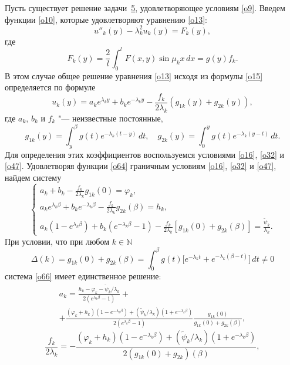 \smallskip

Пусть существует решение задачи~\hyperlink{sab:task5}{5}, удовлетворяющее условиям \eqref{o9}. 
Введем функции \eqref{o10}, которые удовлетворяют уравнению \eqref{o13}:
$$
u''_k(y)-\lambda^2_ku_k(y)=F_k(y), 
$$
где
$$
F_k(y)=\frac{2}{l}\int _{0}^{l}F(x,y)\sin\mu_kx\,dx=g(y)f_k.
$$
В этом случае общее решение уравнения \eqref{o13} исходя из формулы \eqref{o15} определяется по формуле
\begin{equation}
\label{o64}
u_k(y)=a_ke^{\lambda_ky}+b_ke^{-\lambda_ky}-\frac{f_k}{2\lambda_k} \left(g_{1k}(y)+g_{2k}(y)\right),
\end{equation}
где $a_k$, $b_k$ и $f_k$ "--- неизвестные постоянные,
\begin{equation}
\label{o65}
g_{1k}(y)=\int _{y}^{\beta}g(t)e^{-\lambda_k(t-y)}\,dt,\quad  
g_{2k}(y)=\int _{0}^{y}g(t)e^{-\lambda_k(y-t)}\,dt.
\end{equation}
Для определения этих коэффициентов воспользуемся условиями \eqref{o16}, \eqref{o32} и \eqref{o47}.
Удовлетворяя функции \eqref{o64} граничным условиям \eqref{o16}, \eqref{o32} и \eqref{o47}, найдем систему
\begin{equation}
\label{o66}
\begin{cases}
      \displaystyle a_k+b_k-\frac{f_k}{2\lambda_k}g_{1k}(0)=\varphi_k, \\
      \displaystyle a_ke^{\lambda_k\beta}+b_ke^{-\lambda_k\beta}-\frac{f_k}{2\lambda_k}g_{2k}(\beta)=h_k,\\
      \displaystyle a_k(1-e^{\lambda_k\beta})+b_k(e^{-\lambda_k\beta}-1)-\frac{f_k}{2\lambda_k} [g_{1k}(0)+g_{2k}(\beta)]=\frac{\widetilde{\psi}_k}{\lambda_k}.
    \end{cases}
\end{equation}
При условии, что при любом $k\in\mathbb{N}$
\begin{equation}\label{o67}
\Delta(k)=g_{1k}(0)+g_{2k}(\beta)=\int _{0}^{\beta}g(t) \bigl[e^{-\lambda_kt}+e^{-\lambda_k(\beta-t)}\bigr]\,dt\neq0
\end{equation}
система \eqref{o66} имеет единственное решение:
\begin{multline}
\label{o68} 
a_k=\frac{h_k-\varphi_k-\widetilde{\psi}_k/\lambda_k}{2(e^{\lambda_k\beta}-1)}+ 
\\+
\frac{(\varphi_k+h_k)(1-e^{-\lambda_k\beta})+(\widetilde{\psi}_k/\lambda_k)(1+e^{-\lambda_k\beta})} {2(e^{\lambda_k\beta}-1)} 
\frac{g_{1k}(0)}{g_{1k}(0)+g_{2k}(\beta)},
\end{multline}  
\begin{equation}\label{o69}
\frac{f_k}{2\lambda_k}=-\frac{(\varphi_k+h_k)(1-e^{-\lambda_k\beta})+(\widetilde{\psi}_k/\lambda_k)(1+e^{-\lambda_k\beta})} {2(g_{1k}(0)+g_{2k})(\beta)},
\end{equation}
